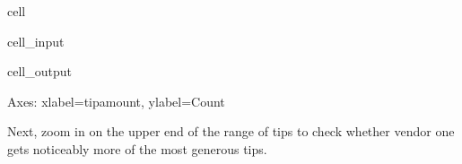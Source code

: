 \documentclass[letterpaper,10pt,english]{sphinxmanual}
\begin{document}
\begin{sphinxuseclass}{cell}
\begin{sphinxuseclass}{cell_input}
\begin{sphinxVerbatim}[commandchars=\\\{\}]
\PYG{p}{[}\PYG{p}{]} 
\end{sphinxVerbatim}

\end{sphinxuseclass}
\begin{sphinxuseclass}{cell_output}
\begin{sphinxVerbatim}[commandchars=\\\{\}]
\PYGZlt{}Axes: xlabel=\PYGZsq{}tip\PYGZus{}amount\PYGZsq{}, ylabel=\PYGZsq{}Count\PYGZsq{}\PYGZgt{}
\end{sphinxVerbatim}

\noindent{}

\end{sphinxuseclass}
\end{sphinxuseclass}
\sphinxAtStartPar
Next, zoom in on the upper end of the range of tips to check whether vendor one gets noticeably more of the most generous tips.
\end{document}
